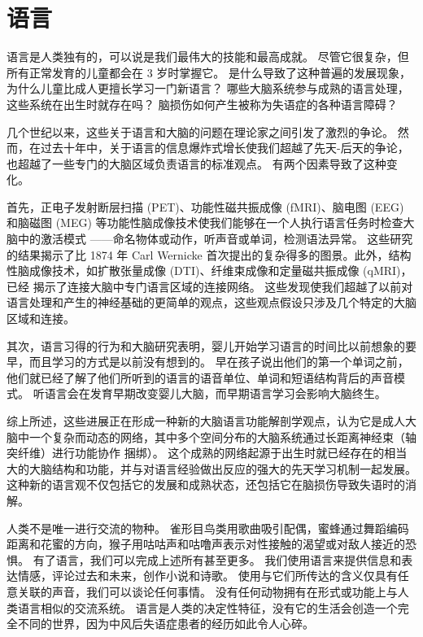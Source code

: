 \chapter{语言} \label{chap:chap55}

语言是人类独有的，可以说是我们最伟大的技能和最高成就。
尽管它很复杂，但所有正常发育的儿童都会在 3 岁时掌握它。
是什么导致了这种普遍的发展现象，为什么儿童比成人更擅长学习一门新语言？
哪些大脑系统参与成熟的语言处理，这些系统在出生时就存在吗？
脑损伤如何产生被称为失语症的各种语言障碍？


几个世纪以来，这些关于语言和大脑的问题在理论家之间引发了激烈的争论。
然而，在过去十年中，关于语言的信息爆炸式增长使我们超越了先天-后天的争论，也超越了一些专门的大脑区域负责语言的标准观点。
有两个因素导致了这种变化。


首先，正电子发射断层扫描 (PET)、功能性磁共振成像 (fMRI)、脑电图 (EEG) 和脑磁图 (MEG) 等功能性脑成像技术使我们能够在一个人执行语言任务时检查大脑中的激活模式 ——命名物体或动作，听声音或单词，检测语法异常。
这些研究的结果揭示了比 1874 年 Carl Wernicke 首次提出的复杂得多的图景。此外，结构性脑成像技术，如扩散张量成像 (DTI)、纤维束成像和定量磁共振成像 (qMRI)，已经 揭示了连接大脑中专门语言区域的连接网络。
这些发现使我们超越了以前对语言处理和产生的神经基础的更简单的观点，这些观点假设只涉及几个特定的大脑区域和连接。


其次，语言习得的行为和大脑研究表明，婴儿开始学习语言的时间比以前想象的要早，而且学习的方式是以前没有想到的。
早在孩子说出他们的第一个单词之前，他们就已经了解了他们所听到的语言的语音单位、单词和短语结构背后的声音模式。
听语言会在发育早期改变婴儿大脑，而早期语言学习会影响大脑终生。


综上所述，这些进展正在形成一种新的大脑语言功能解剖学观点，认为它是成人大脑中一个复杂而动态的网络，其中多个空间分布的大脑系统通过长距离神经束（轴突纤维）进行功能协作 捆绑）。
这个成熟的网络起源于出生时就已经存在的相当大的大脑结构和功能，并与对语言经验做出反应的强大的先天学习机制一起发展。
这种新的语言观不仅包括它的发展和成熟状态，还包括它在脑损伤导致失语时的消解。


人类不是唯一进行交流的物种。
雀形目鸟类用歌曲吸引配偶，蜜蜂通过舞蹈编码距离和花蜜的方向，猴子用咕咕声和咕噜声表示对性接触的渴望或对敌人接近的恐惧。
有了语言，我们可以完成上述所有甚至更多。
我们使用语言来提供信息和表达情感，评论过去和未来，创作小说和诗歌。
使用与它们所传达的含义仅具有任意关联的声音，我们可以谈论任何事情。
没有任何动物拥有在形式或功能上与人类语言相似的交流系统。
语言是人类的决定性特征，没有它的生活会创造一个完全不同的世界，因为中风后失语症患者的经历如此令人心碎。



